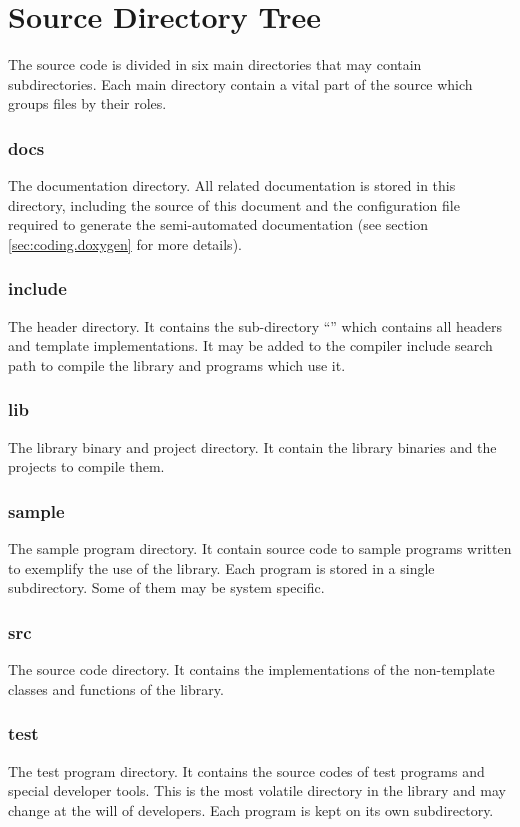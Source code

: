 \section{Source Directory Tree}
\label{sec:coding.dirtree}

The \libname{ } source code is divided in six main directories that may contain subdirectories. Each main directory contain a vital part of the source which groups files by their roles.

\subsubsection{docs}
The documentation directory. All related documentation is stored in this directory, including the source of this document and the configuration file required to generate the semi-automated documentation (see section \ref{sec:coding.doxygen} for more details).

\subsubsection{include}
The header directory. It contains the sub-directory ``\libtitle'' which contains all headers and template implementations. It may be added to the compiler include search path to compile the library and programs which use it.

\subsubsection{lib}
The library binary and project directory. It contain the library binaries and the projects to compile them.

\subsubsection{sample}
The sample program directory. It contain source code to sample programs written to exemplify the use of the library. Each program is stored in a single subdirectory. Some of them may be system specific.

\subsubsection{src}
The source code directory. It contains the implementations of the non-template classes and functions of the library.

\subsubsection{test}
The test program directory. It contains the source codes of test programs and special developer tools. This is the most volatile directory in the library and may change at the will of developers. Each program is kept on its own subdirectory.

